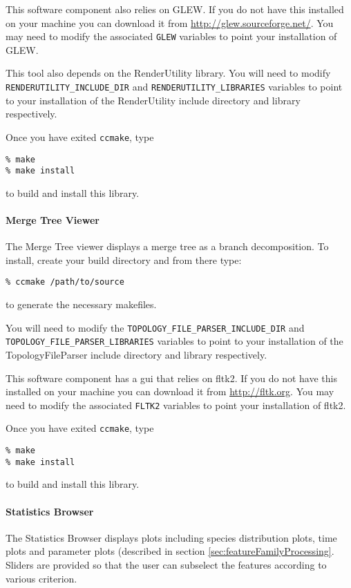 This software component also relies on GLEW.  If you do not have this installed
on your machine you can download it from \url{http://glew.sourceforge.net/}.  You may need to 
modify the associated \texttt{GLEW} variables to point your installation of GLEW.

This tool also depends on the RenderUtility library. You will need to modify
\texttt{RENDERUTILITY\_INCLUDE\_DIR} and 
\texttt{RENDERUTILITY\_LIBRARIES} variables to point to your installation of the 
RenderUtility include directory and library respectively.

Once you have exited \texttt{ccmake}, type 

\texttt{\% make}\\
\texttt{\% make install}

to build and install this library.


\paragraph{Merge Tree Viewer} 
The Merge Tree viewer displays a merge tree as a branch decomposition.  
To install, create your build directory and from there type:

\texttt{\% ccmake /path/to/source}

to generate the necessary makefiles. 

You will need to modify the \texttt{TOPOLOGY\_FILE\_PARSER\_INCLUDE\_DIR} and \texttt{TOPOLOGY\_FILE\_PARSER\_LIBRARIES} 
variables to point to your installation of the TopologyFileParser include directory and 
library respectively.

This software component has a gui that relies on fltk2.  If you do not have this installed
on your machine you can download it from \url{http://fltk.org}.  You may need to modify the associated 
\texttt{FLTK2} variables to point your installation of fltk2.

Once you have exited \texttt{ccmake}, type 

\texttt{\% make}\\
\texttt{\% make install}

to build and install this library.


\paragraph{Statistics Browser} 
The Statistics Browser displays plots including species distribution plots, time plots and 
parameter plots (described in section \ref{sec:featureFamilyProcessing}. Sliders are provided
so that the user can subselect the features according to various criterion.

